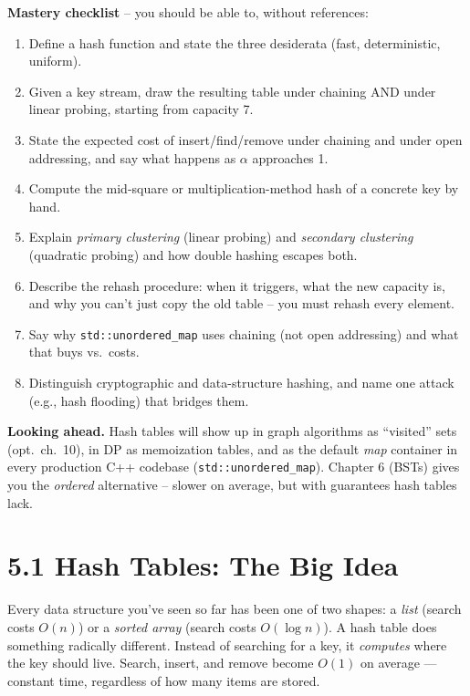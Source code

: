\documentclass[11pt]{article}
\begin{document}
\begin{ideabox}
\textbf{Mastery checklist} -- you should be able to, without references:
\begin{enumerate}
    \item Define a hash function and state the three desiderata (fast,
          deterministic, uniform).
    \item Given a key stream, draw the resulting table under chaining
          AND under linear probing, starting from capacity 7.
    \item State the expected cost of insert/find/remove under chaining
          and under open addressing, and say what happens as $\alpha$
          approaches 1.
    \item Compute the mid-square or multiplication-method hash of a
          concrete key by hand.
    \item Explain \emph{primary clustering} (linear probing) and
          \emph{secondary clustering} (quadratic probing) and how double
          hashing escapes both.
    \item Describe the rehash procedure: when it triggers, what the new
          capacity is, and why you can't just copy the old table -- you
          must rehash every element.
    \item Say why \texttt{std::unordered\_map} uses chaining (not open
          addressing) and what that buys vs.\ costs.
    \item Distinguish cryptographic and data-structure hashing, and name
          one attack (e.g., hash flooding) that bridges them.
\end{enumerate}

\textbf{Looking ahead.} Hash tables will show up in graph algorithms as
``visited'' sets (opt.\ ch.~10), in DP as memoization tables, and as the
default \emph{map} container in every production C++ codebase
(\texttt{std::unordered\_map}). Chapter 6 (BSTs) gives you the
\emph{ordered} alternative -- slower on average, but with guarantees
hash tables lack.
\end{ideabox}

\section{5.1 Hash Tables: The Big Idea}

Every data structure you've seen so far has been one of two shapes:
a \emph{list} (search costs $O(n)$) or a \emph{sorted array} (search
costs $O(\log n)$). A hash table does something radically different.
Instead of searching for a key, it \emph{computes} where the key
should live. Search, insert, and remove become $O(1)$ on
average --- constant time, regardless of how many items are
stored.
\end{document}
